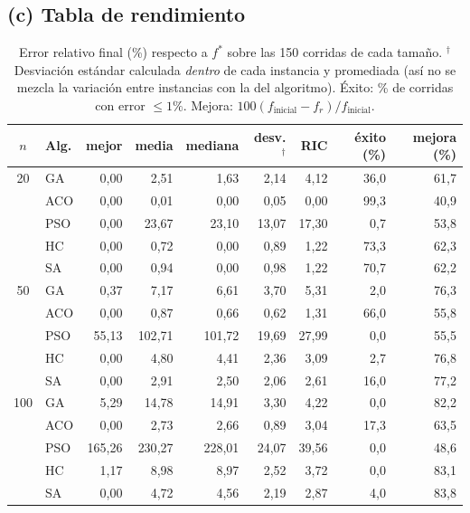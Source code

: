 \documentclass[11pt,a4paper]{article}
\begin{document}
\subsection{(c) Tabla de rendimiento}
\begin{table}[H]\centering\small
\begin{tabular}{clrrrrrrr}
\toprule
$n$ & Alg. & mejor & media & mediana & desv.$^\dagger$ & RIC & éxito (\%) & mejora (\%) \\
\midrule
20 & GA & 0{,}00 & 2{,}51 & 1{,}63 & 2{,}14 & 4{,}12 & 36{,}0 & 61{,}7 \\
 & ACO & 0{,}00 & 0{,}01 & 0{,}00 & 0{,}05 & 0{,}00 & 99{,}3 & 40{,}9 \\
 & PSO & 0{,}00 & 23{,}67 & 23{,}10 & 13{,}07 & 17{,}30 & 0{,}7 & 53{,}8 \\
 & HC & 0{,}00 & 0{,}72 & 0{,}00 & 0{,}89 & 1{,}22 & 73{,}3 & 62{,}3 \\
 & SA & 0{,}00 & 0{,}94 & 0{,}00 & 0{,}98 & 1{,}22 & 70{,}7 & 62{,}2 \\
\midrule
50 & GA & 0{,}37 & 7{,}17 & 6{,}61 & 3{,}70 & 5{,}31 & 2{,}0 & 76{,}3 \\
 & ACO & 0{,}00 & 0{,}87 & 0{,}66 & 0{,}62 & 1{,}31 & 66{,}0 & 55{,}8 \\
 & PSO & 55{,}13 & 102{,}71 & 101{,}72 & 19{,}69 & 27{,}99 & 0{,}0 & 55{,}5 \\
 & HC & 0{,}00 & 4{,}80 & 4{,}41 & 2{,}36 & 3{,}09 & 2{,}7 & 76{,}8 \\
 & SA & 0{,}00 & 2{,}91 & 2{,}50 & 2{,}06 & 2{,}61 & 16{,}0 & 77{,}2 \\
\midrule
100 & GA & 5{,}29 & 14{,}78 & 14{,}91 & 3{,}30 & 4{,}22 & 0{,}0 & 82{,}2 \\
 & ACO & 0{,}00 & 2{,}73 & 2{,}66 & 0{,}89 & 3{,}04 & 17{,}3 & 63{,}5 \\
 & PSO & 165{,}26 & 230{,}27 & 228{,}01 & 24{,}07 & 39{,}56 & 0{,}0 & 48{,}6 \\
 & HC & 1{,}17 & 8{,}98 & 8{,}97 & 2{,}52 & 3{,}72 & 0{,}0 & 83{,}1 \\
 & SA & 0{,}00 & 4{,}72 & 4{,}56 & 2{,}19 & 2{,}87 & 4{,}0 & 83{,}8 \\
\bottomrule
\end{tabular}

\caption{Error relativo final (\%) respecto a $f^\ast$ sobre las 150 corridas de cada tamaño. $^\dagger$Desviación estándar calculada \emph{dentro} de cada instancia y promediada
(así no se mezcla la variación entre instancias con la del algoritmo). Éxito: \% de corridas con error $\le1\text{\%}$. Mejora: $100(f_{\text{inicial}}-f_r)/f_{\text{inicial}}$.}
\end{table}
\end{document}
